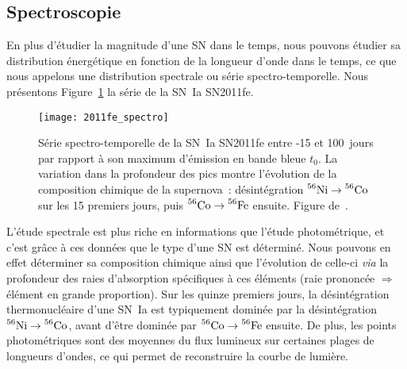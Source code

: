 \documentclass[../main/main.tex]{subfiles}
\begin{document}
\subsection{Spectroscopie}\label{ssec:spectro}

En plus d'étudier la magnitude d'une SN dans le temps, nous pouvons étudier sa
distribution énergétique en fonction de la longueur d'onde dans le temps, ce
que nous appelons une distribution spectrale ou série spectro-temporelle. Nous
présentons Figure~\ref{fig:2011fe_spec} la série de la SN~Ia SN2011fe.

\begin{figure}[]
    \centering
    \texttt{[image: 2011fe\_spectro]}
    \caption[Série spectro-temporelle de la SN~Ia SN2011fe]{Série
        spectro-temporelle de la SN~Ia SN2011fe entre -15 et \SI{100}{jours} par
        rapport à son maximum d'émission en bande bleue $t_0$. La variation dans
        la profondeur des pics montre l'évolution de la composition chimique de
        la supernova~: désintégration $\prescript{56}{}{\mathrm{Ni}}
        \rightarrow \prescript{56}{}{\mathrm{Co}}$ sur les 15 premiers jours,
        puis $ \prescript{56}{}{\mathrm{Co}} \rightarrow
        \prescript{56}{}{\mathrm{Fe}}$ ensuite. Figure de~\cite{pereira2013}.}
        \label{fig:2011fe_spec}
\end{figure}

L'étude spectrale est plus riche en informations que l'étude photométrique, et
c'est grâce à ces données que le type d'une SN est déterminé. Nous pouvons en
effet déterminer sa composition chimique ainsi que l'évolution de celle-ci
\textit{via} la profondeur des raies d'absorption spécifiques à ces éléments
(raie prononcée $\Rightarrow$ élément en grande proportion). Sur les quinze
premiers jours, la désintégration thermonucléaire d'une SN~Ia est typiquement
dominée par la désintégration $\prescript{56}{}{\mathrm{Ni}} \rightarrow
\prescript{56}{}{\mathrm{Co}}$, avant d'être dominée par 
$\prescript{56}{}{\mathrm{Co}} \rightarrow \prescript{56}{}{\mathrm{Fe}}$
ensuite. De plus, les points photométriques sont des moyennes du flux lumineux
sur certaines plages de longueurs d'ondes, ce qui permet de reconstruire la
courbe de lumière.
\end{document}

